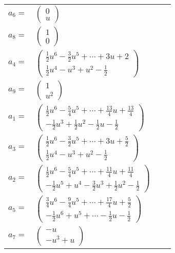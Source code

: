 \documentclass[1p]{elsarticle_modified}
\theoremstyle{definition}
\begin{document}
\begin{tabular}{m{7pt} m{180pt} m{7pt} m{180pt} }
\flushright $a_{6}=$&$\begin{pmatrix}0\\u\end{pmatrix}$ \\
\flushright $a_{8}=$&$\begin{pmatrix}1\\0\end{pmatrix}$ \\
\flushright $a_{4}=$&$\begin{pmatrix}\frac{1}{2} u^6-\frac{3}{2} u^5+\cdots+3 u+2\\\frac{1}{2} u^4- u^3+u^2-\frac{1}{2}\end{pmatrix}$ \\
\flushright $a_{9}=$&$\begin{pmatrix}1\\u^2\end{pmatrix}$ \\
\flushright $a_{1}=$&$\begin{pmatrix}\frac{1}{2} u^6-\frac{5}{4} u^5+\cdots+\frac{13}{4} u+\frac{13}{4}\\-\frac{1}{2} u^3+\frac{1}{2} u^2-\frac{1}{2} u-\frac{1}{2}\end{pmatrix}$ \\
\flushright $a_{3}=$&$\begin{pmatrix}\frac{1}{2} u^6-\frac{3}{2} u^5+\cdots+3 u+\frac{5}{2}\\\frac{1}{2} u^4- u^3+u^2-\frac{1}{2}\end{pmatrix}$ \\
\flushright $a_{2}=$&$\begin{pmatrix}\frac{1}{2} u^6-\frac{5}{4} u^5+\cdots+\frac{11}{4} u+\frac{11}{4}\\-\frac{1}{2} u^5+u^4-\frac{3}{2} u^3+\frac{1}{2} u^2-\frac{1}{2}\end{pmatrix}$ \\
\flushright $a_{5}=$&$\begin{pmatrix}\frac{3}{4} u^6-\frac{9}{4} u^5+\cdots+\frac{17}{4} u+\frac{5}{2}\\-\frac{1}{2} u^6+u^5+\cdots-\frac{1}{2} u-\frac{1}{2}\end{pmatrix}$ \\
\flushright $a_{7}=$&$\begin{pmatrix}- u\\- u^3+u\end{pmatrix}$ \\

\end{tabular}
\end{document}
